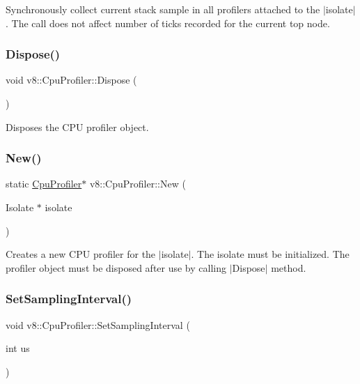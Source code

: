 Synchronously collect current stack sample in all profilers attached to the $\vert$isolate$\vert$. The call does not affect number of ticks recorded for the current top node. \mbox{\label{classv8_1_1CpuProfiler_ab49b3f25a897dc6a359571b3014cd225}} 
\subsubsection{\texorpdfstring{Dispose()}{Dispose()}}
{\footnotesize\ttfamily void v8\+::\+Cpu\+Profiler\+::\+Dispose (\begin{DoxyParamCaption}{ }\end{DoxyParamCaption})}

Disposes the C\+PU profiler object. \mbox{\label{classv8_1_1CpuProfiler_a9850aa42c5580c686cde1555f09577aa}} 
\subsubsection{\texorpdfstring{New()}{New()}}
{\footnotesize\ttfamily static \mbox{\hyperlink{classv8_1_1CpuProfiler}{Cpu\+Profiler}}$\ast$ v8\+::\+Cpu\+Profiler\+::\+New (\begin{DoxyParamCaption}\item[{Isolate $\ast$}]{isolate }\end{DoxyParamCaption})\hspace{0.3cm}{\ttfamily [static]}}

Creates a new C\+PU profiler for the $\vert$isolate$\vert$. The isolate must be initialized. The profiler object must be disposed after use by calling $\vert$\+Dispose$\vert$ method. \mbox{\label{classv8_1_1CpuProfiler_ac5b05c72fb899e20adfa7f8cc57f21fb}} 
\subsubsection{\texorpdfstring{Set\+Sampling\+Interval()}{SetSamplingInterval()}}
{\footnotesize\ttfamily void v8\+::\+Cpu\+Profiler\+::\+Set\+Sampling\+Interval (\begin{DoxyParamCaption}\item[{int}]{us }\end{DoxyParamCaption})}

